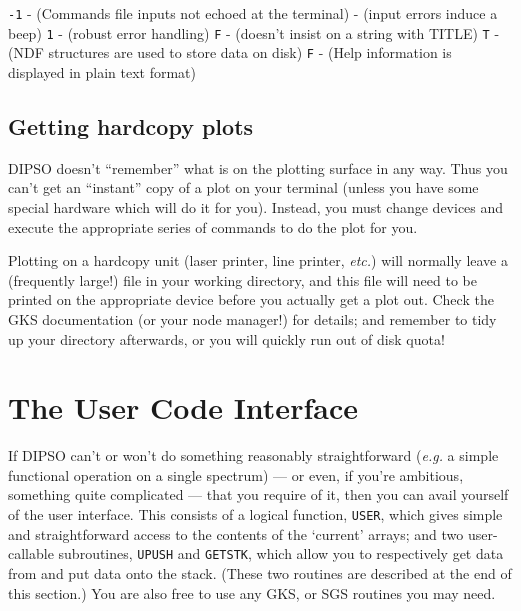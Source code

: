 \documentclass[twoside,11pt,noabs,nolof]{starlink}
\begin{document}
  {\texttt{-1}}  - (Commands file inputs not echoed at the terminal) \newline
{}  - (input errors induce a beep) \newline
{}  {\texttt{1}}  - (robust error handling) \newline
{}  {\texttt{F}}  - (doesn't insist on a string with TITLE) \newline
{}  {\texttt{T}}  - (NDF structures are used to store data on disk) \newline
{}  {\texttt{F}}  - (Help information is displayed in  plain text format) \newline

\subsection {Getting hardcopy plots}

DIPSO doesn't ``remember'' what is on the plotting surface in any way.
Thus you can't get an ``instant'' copy of a plot on your terminal
(unless you have some special hardware which will do it for you).
Instead, you must change devices and execute the appropriate series
of commands to do the plot for you.

Plotting on a hardcopy unit (laser printer, line printer, \emph{etc.})
will normally leave a (frequently large!) file in your working
directory, and this file will need to be printed on the appropriate
device before you actually get a plot out. Check the GKS documentation
(or your node manager!) for details; and remember to tidy up your
directory afterwards, or you will quickly run out of disk quota!

\section {The User Code Interface}

If DIPSO can't or won't do something reasonably straightforward (\emph{e.g.} a simple functional operation on a single spectrum) --- or even,
if you're ambitious, something quite complicated --- that you
require of it, then you can avail yourself of the user interface. This
consists of a logical function, {\texttt{USER}},  which gives simple and
straightforward access to the contents of the `current' arrays; and
two user-callable subroutines, {\texttt{UPUSH}}  and {\texttt{GETSTK}},  which
allow you to respectively get data from and put data onto the stack.
(These two routines are described at the end of this section.) You are
also free to use any GKS, or SGS routines you may need.
\end{document}
